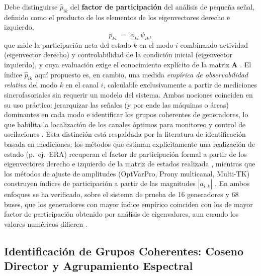 Debe distinguirse $\hat{p}_{ik}$ del \textbf{factor de participación} del
análisis de pequeña señal, definido como el producto de los elementos de
los eigenvectores derecho e izquierdo,
\begin{equation}
    p_{ki} \;=\; \phi_{ki}\,\psi_{ik},
    \label{eq:participation_state}
\end{equation}
que mide la participación neta del estado $k$ en el modo $i$ combinando
actividad (eigenvector derecho) y controlabilidad de la condición inicial
(eigenvector izquierdo), y cuya evaluación exige el conocimiento explícito
de la matriz $\mathbf{A}$ \cite{kundur1994}. El índice $\hat{p}_{ik}$ aquí
propuesto es, en cambio, una medida \textit{empírica de observabilidad
relativa} del modo $k$ en el canal $i$, calculable exclusivamente a partir
de mediciones sincrofasoriales sin requerir un modelo del sistema. Ambas
nociones coinciden en su uso práctico: jerarquizar las señales (y por ende
las máquinas o áreas) dominantes en cada modo e identificar los grupos
coherentes de generadores, lo que habilita la localización de los canales
óptimos para monitoreo y control de oscilaciones \cite{sauer2017}. Esta
distinción está respaldada por la literatura de identificación basada en
mediciones: los métodos que estiman explícitamente una realización de
estado (p.~ej.\ ERA) recuperan el factor de participación formal a partir
de los eigenvectores derecho e izquierdo de la matriz de estados
realizada \cite{li2020era}, mientras que los métodos de ajuste de
amplitudes (OptVarPro, Prony multicanal, Multi-TK) construyen índices de
participación a partir de las magnitudes $|a_{i,k}|$
\cite{jiang2021}. En ambos enfoques se ha verificado, sobre el sistema de
prueba de 16 generadores y 68 buses, que los generadores con mayor índice
empírico coinciden con los de mayor factor de participación obtenido por
análisis de eigenvalores, aun cuando los valores numéricos difieren
\cite{jiang2021,li2020era}.

\subsection{Identificación de Grupos Coherentes: Coseno Director y
Agrupamiento Espectral}


